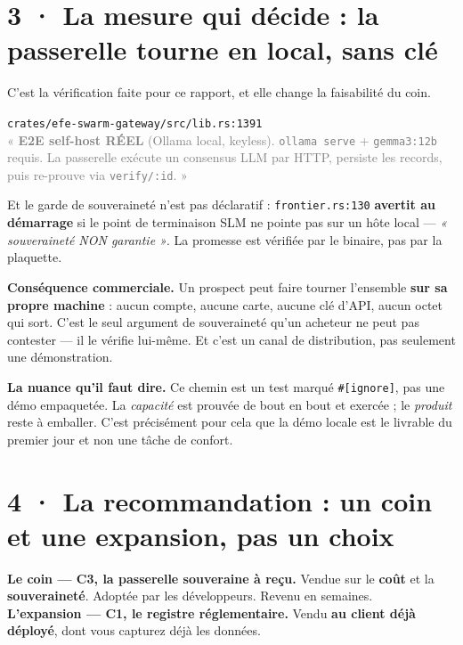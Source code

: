 \documentclass[10pt]{article}
\newcommand{\sz}[1]{\textcolor{grey}{\small\textsf{#1}}}
\newcommand{\code}[1]{\texttt{\small #1}}
\begin{document}
\section{3 · La mesure qui décide : la passerelle tourne en local, sans clé}

C'est la vérification faite pour ce rapport, et elle change la faisabilité du coin.

\begin{extrait}
\code{crates/efe-swarm-gateway/src/lib.rs:1391} \\[3pt]
\sz{« \textbf{E2E self-host RÉEL} (Ollama local, keyless). \code{ollama serve} + \code{gemma3:12b}
requis. La passerelle exécute un consensus LLM par HTTP, persiste les records, puis re-prouve via
\code{verify/:id}. »}
\end{extrait}

Et le garde de souveraineté n'est pas déclaratif : \code{frontier.rs:130} \textbf{avertit au démarrage}
si le point de terminaison SLM ne pointe pas sur un hôte local --- \emph{« souveraineté NON
garantie »}. La promesse est vérifiée par le binaire, pas par la plaquette.

\begin{acquis}
\textbf{Conséquence commerciale.} Un prospect peut faire tourner l'ensemble \textbf{sur sa propre
machine} : aucun compte, aucune carte, aucune clé d'API, aucun octet qui sort. C'est le seul argument
de souveraineté qu'un acheteur ne peut pas contester --- il le vérifie lui-même. Et c'est un canal de
distribution, pas seulement une démonstration.
\end{acquis}

\begin{alerte}
\textbf{La nuance qu'il faut dire.} Ce chemin est un test marqué \code{\#[ignore]}, pas une démo
empaquetée. La \emph{capacité} est prouvée de bout en bout et exercée ; le \emph{produit} reste à
emballer. C'est précisément pour cela que la démo locale est le livrable du premier jour et non une
tâche de confort.
\end{alerte}

\section{4 · La recommandation : un coin et une expansion, pas un choix}

\begin{piste}
\textbf{Le coin --- C3, la passerelle souveraine à reçu.} Vendue sur le \textbf{coût} et la
\textbf{souveraineté}. Adoptée par les développeurs. Revenu en semaines. \\[4pt]
\textbf{L'expansion --- C1, le registre réglementaire.} Vendu \textbf{au client déjà déployé}, dont
vous capturez déjà les données.
\end{piste}
\end{document}
